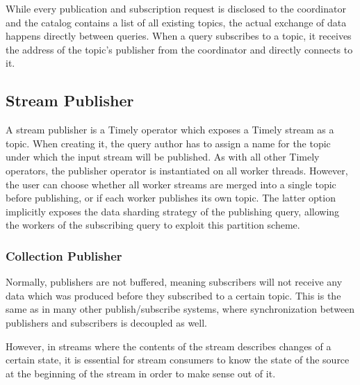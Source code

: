 While every publication and subscription request is disclosed to the coordinator
and the catalog contains a list of all existing topics, the
actual exchange of data happens directly between queries. When a query subscribes
to a topic, it receives the address of the topic's publisher from the coordinator
and directly connects to it.

\subsection{Stream Publisher}

A stream publisher is a Timely operator which exposes a Timely stream as a topic. When
creating it, the query author has to assign a name for the topic under which the
input stream will be published. As with all other Timely operators, the publisher
operator is instantiated on all worker threads. However, the user can choose
whether all worker streams are merged into a single topic before publishing, or
if each worker publishes its own topic. The latter option implicitly exposes
the data sharding strategy of the publishing query, allowing the workers of
the subscribing query to exploit this partition scheme.

\subsubsection{Collection Publisher}

Normally, publishers are not buffered, meaning subscribers will
not receive any data which was produced before they subscribed to a certain
topic. This is the same as in many other publish/subscribe systems, where
synchronization between publishers and subscribers is decoupled as well. \cite{pubsub}

However, in streams where the contents of the stream describes changes of a certain
state, it is essential for stream consumers to know the state of the source at
the beginning of the stream in order to make sense out of it.

